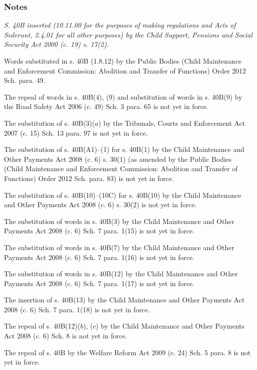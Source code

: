 \documentclass[a4paper]{article}
\newcommand\amendment[1]{\subsubsection*{Notes}{\itshape\frenchspacing\footnotesize #1 \par}}
\begin{document}
\amendment{
S. 40B inserted (10.11.00 for the purposes of making regulations and Acts of Sederunt, 2.4.01 for all other purposes) by the Child Support, Pensions and Social Security Act 2000 (c. 19) s. 17(2).


Words substituted in s. 40B (1.8.12) by the Public Bodies (Child Maintenance and Enforcement Commission: Abolition and Transfer of Functions) Order 2012 Sch. para. 49.

The repeal of words in s. 40B(4), (9) and substitution of words in s. 40B(9) by the Road Safety Act 2006 (c. 49) Sch. 3 para. 65 is not yet in force.

The substitution of s. 40B(3)($a$) by the Tribunals, Courts and Enforcement Act 2007 (c. 15) Sch. 13 para. 97 is not yet in force.

The substitution of s. 40B(A1)--(1) for s. 40B(1) by the Child Maintenance and Other Payments Act 2008 (c. 6) s. 30(1) (as amended by the Public Bodies (Child Maintenance and Enforcement Commission: Abolition and Transfer of Functions) Order 2012 Sch. para. 83) is not yet in force.

The substitution of s. 40B(10)--(10C) for s. 40B(10) by the Child Maintenance and Other Payments Act 2008 (c. 6) s. 30(2) is not yet in force.

The substitution of words in s. 40B(3) by the Child Maintenance and Other Payments Act 2008 (c. 6) Sch. 7 para. 1(15) is not yet in force.

The substitution of words in s. 40B(7) by the Child Maintenance and Other Payments Act 2008 (c. 6) Sch. 7 para. 1(16) is not yet in force.

The substitution of words in s. 40B(12) by the Child Maintenance and Other Payments Act 2008 (c. 6) Sch. 7 para. 1(17) is not yet in force.

The insertion of s. 40B(13) by the Child Maintenance and Other Payments Act 2008 (c. 6) Sch. 7 para. 1(18) is not yet in force.

The repeal of s. 40B(12)($b$), ($c$) by the Child Maintenance and Other Payments Act 2008 (c. 6) Sch. 8 is not yet in force.

The repeal of s. 40B by the Welfare Reform Act 2009 (c. 24) Sch. 5 para. 8 is not yet in force.

}
\end{document}
